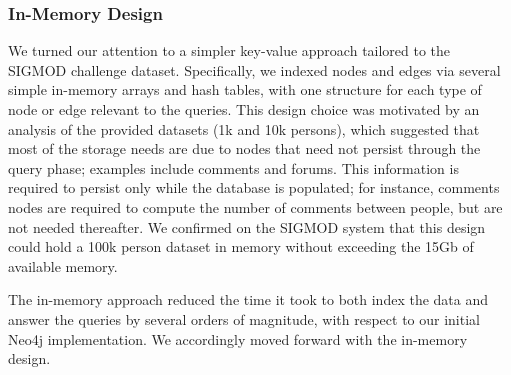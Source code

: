 \documentclass{article}
\begin{document}
\subsubsection{In-Memory Design}
We turned our attention to a simpler key-value approach tailored to
the SIGMOD challenge dataset.  Specifically, we indexed nodes and
edges via several simple in-memory arrays and hash tables, with one
structure for each type of node or edge relevant to the queries.  This
design choice was motivated by an analysis of the provided datasets
(1k and 10k persons), which suggested that most of the storage needs
are due to nodes that need not persist through the query phase;
examples include comments and forums. This information is required to
persist only while the database is populated; for instance, comments
nodes are required to compute the number of comments between people,
but are not needed thereafter.  We confirmed on the SIGMOD system that
this design could hold a 100k person dataset in memory without
exceeding the 15Gb of available memory.

The in-memory approach reduced the time it took to both index the
data and answer the queries by several orders of
magnitude, with respect to our initial Neo4j implementation.  We
accordingly moved forward with the in-memory design.


\end{document}
